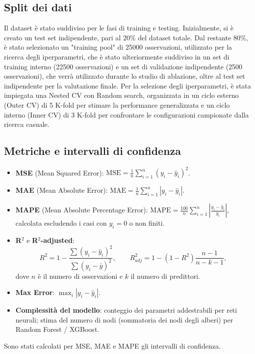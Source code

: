 \documentclass[a4paper,12pt]{report}
\begin{document}
	\subsection{Split dei dati}
	Il dataset è stato suddiviso per le fasi di training e testing. Inizialmente, si è creato un test set indipendente, pari al 20\% del dataset totale. Dal restante 80\%, è stato selezionato un "training pool" di 25000 osservazioni, utilizzato per la ricerca degli iperparametri, che è stato ulteriormente suddiviso in un set di training interno (22500 osservazioni) e un set di validazione indipendente (2500 osservazioni), che verrà utilizzato durante lo studio di ablazione, oltre al test set indipendente per la valutazione finale. Per la selezione degli iperparametri, è stata impiegata una Nested CV con Random search, organizzata in un ciclo esterno (Outer CV) di 5 K-fold per stimare la performance generalizzata e un ciclo interno (Inner CV) di 3 K-fold per confrontare le configurazioni campionate dalla ricerca casuale.
	
	\subsection{Metriche e intervalli di confidenza}
	\begin{itemize}
		\item \textbf{MSE} (Mean Squared Error): \(\text{MSE} = \frac{1}{n} \sum_{i=1}^{n} (y_i - \hat{y}_i)^2\).
		\item \textbf{MAE} (Mean Absolute Error): \(\text{MAE} = \frac{1}{n} \sum_{i=1}^{n} |y_i - \hat{y}_i|\).
		\item \textbf{MAPE} (Mean Absolute Percentage Error): \(\text{MAPE} = \frac{100}{n} \sum_{i=1}^{n} \left| \frac{y_i - \hat{y}_i}{y_i} \right|\), calcolata escludendo i casi con \(y_i=0\) o non finiti.
		\item \textbf{R\(^2\)} e \textbf{R\(^2\)-adjusted}:
		\[
		R^2 = 1 - \frac{\sum (y_i - \hat{y}_i)^2}{\sum (y_i - \bar{y})^2}, \qquad
		R^2_{adj} = 1 - (1 - R^2)\frac{n-1}{n-k-1},
		\]
		dove \(n\) è il numero di osservazioni e \(k\) il numero di predittori.
		\item \textbf{Max Error}: \(\max_i |y_i - \hat{y}_i|\).
		\item \textbf{Complessità del modello}: conteggio dei parametri addestrabili per reti neurali; stima del numero di nodi (sommatoria dei nodi degli alberi) per Random Forest / XGBoost.
	\end{itemize}
	Sono stati calcolati per MSE, MAE e MAPE gli intervalli di confidenza.
	
\end{document}
